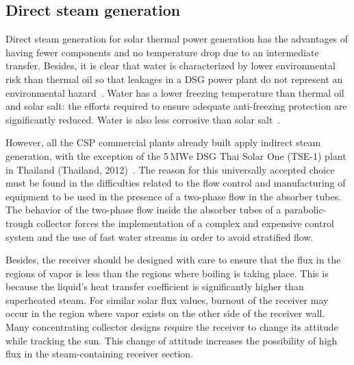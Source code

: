 \subsection{Direct steam generation}
Direct steam generation for solar thermal power generation has the advantages of having fewer components and no temperature drop due to an intermediate transfer. Besides, it is clear that water is characterized by lower environmental risk than thermal oil so that leakages in a DSG power plant do not represent an environmental hazard~\cite{Fernandez2010}. Water has a lower freezing temperature than thermal oil and solar salt: the efforts required to ensure adequate anti-freezing protection are significantly reduced. Water is also less corrosive than solar salt~\cite{Giglio2017}.
 
However, all the CSP commercial plants already built apply indirect steam generation, with the exception of the 5$\,\mathrm{MWe}$ DSG Thai Solar One (TSE-1) plant in Thailand (Thailand, 2012)~\cite{Khenissi2015}. 
The reason for this universally accepted choice must be found in the difficulties related to the flow control and manufacturing of equipment to be used in the presence of a two-phase flow in the absorber tubes. 
The behavior of the two-phase flow inside the absorber tubes of a parabolic-trough collector forces the implementation of a complex and expensive control system and the use of fast water streams in order to avoid stratified flow.

Besides, the receiver should be designed with care to ensure that the flux in the regions of vapor is less than the regions where boiling is taking place.
This is because the liquid's heat transfer coefficient is significantly higher than superheated steam. For similar solar flux values, burnout of the receiver may occur in the region where vapor exists on the other side of the receiver wall. 
Many concentrating collector designs require the receiver to change its attitude while tracking the sun. This change of attitude increases the possibility of high flux in the steam-containing receiver section.
			
